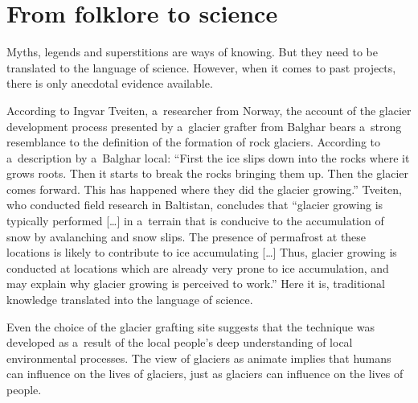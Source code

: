 \section{From folklore to science}

Myths, legends and superstitions are ways of knowing. But they need to be translated to the language of science.
However, when it comes to past projects, there is only anecdotal evidence available.

According to Ingvar Tveiten, a researcher from Norway, the account of the glacier development process presented
by a glacier grafter from Balghar bears a strong resemblance to the definition of the formation of rock
glaciers. According to a description by a Balghar local: “First the ice slips down into the rocks where it grows
roots. Then it starts to break the rocks bringing them up. Then the glacier comes forward. This has happened
where they did the glacier growing.” Tveiten, who conducted field research in Baltistan, concludes that “glacier
growing is typically performed […] in a terrain that is conducive to the accumulation of snow by avalanching and
snow slips. The presence of permafrost at these locations is likely to contribute to ice accumulating […] Thus,
glacier growing is conducted at locations which are already very prone to ice accumulation, and may explain why
glacier growing is perceived to work.” Here it is, traditional knowledge translated into the language of
science.

Even the choice of the glacier grafting site suggests that the technique was developed as a result of the local
people’s deep understanding of local environmental processes. The view of glaciers as animate implies that
humans can influence on the lives of glaciers, just as glaciers can influence on the lives of people.

